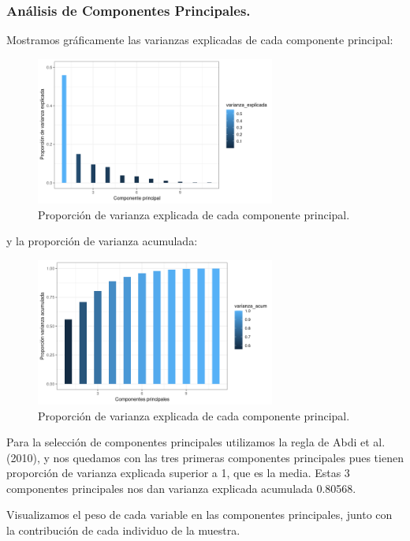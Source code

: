 \documentclass[11pt,a4paper]{article}
\begin{document}
    \subsubsection{Análisis de Componentes Principales.}
    Mostramos gráficamente las varianzas explicadas de cada componente principal:
    \begin{figure}[H]
		\centering
		\includegraphics[width=0.7\textwidth]{images/var_exp}
		\caption{Proporción de varianza explicada de cada componente principal.}
	\end{figure}
	y la proporción de varianza acumulada:
	\begin{figure}[H]
		\centering
		\includegraphics[width=0.7\textwidth]{images/var_exp_acum}
		\caption{Proporción de varianza explicada de cada componente principal.}
	\end{figure}
	
	Para la selección de componentes principales utilizamos la regla de Abdi et al. (2010), y nos quedamos con las tres primeras componentes principales pues tienen proporción de varianza explicada superior a 1, que es la media. Estas 3 componentes principales nos dan varianza explicada acumulada 0.80568.
	
	Visualizamos el peso de cada variable en las componentes principales, junto con la contribución de cada individuo de la muestra.
	
\end{document}
